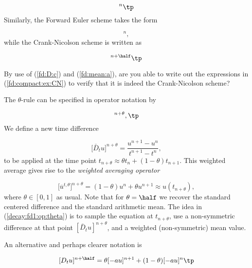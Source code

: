 \documentclass[graybox,sectrefs,envcountresetchap,open=right,final]{svmonodo}
\newenvironment{question_mdfboxadmon}[1][]{
\begin{question_mdfboxmdframed}[frametitle=#1]
}
{
\end{question_mdfboxmdframed}
}
\begin{document}
\begin{equation}
[D_t^- u  = -au]^n \tp
\end{equation}
Similarly, the Forward Euler scheme takes the form

\begin{equation}
[D_t^+ u  = -au]^n,
\end{equation}
while the Crank-Nicolson scheme is written as

\begin{equation}
[D_t u = -a\overline{u}^t]^{n+\half}\tp
\label{fd:compact:ex:CN}
\end{equation}


\begin{question_mdfboxadmon}[Question:]
By use of (\ref{fd:D:c}) and (\ref{fd:mean:a}), are you able to
write out the expressions in (\ref{fd:compact:ex:CN}) to verify that
it is indeed the Crank-Nicolson scheme?
\end{question_mdfboxadmon}




The $\theta$-rule can be specified in operator notation by

\begin{equation}
[\bar D_t u = -a\overline{u}^{t,\theta}]^{n+\theta},\tp
\label{decay:fd1:op:theta}
\end{equation}
We define a new time difference

\begin{equation}
\lbrack\bar D_t u\rbrack^{n+\theta} = \frac{u^{n+1}-u^n}{t^{n+1}-t^n},
\label{decay:fd1:Du:theta}
\end{equation}
to be applied at the time point $t_{n+\theta}\approx\theta t_n + (1-\theta)t_{n+1}$. This weighted average gives rise to the
\emph{weighted averaging operator}

\begin{equation}
\lbrack\overline{u}^{t,\theta}\rbrack^{n+\theta} = (1-\theta)u^{n} + \theta u^{n+1}
\approx u(t_{n+\theta}),
\label{decay:fd1:wmean:a}
\end{equation}
where $\theta\in [0,1]$ as usual. Note that for $\theta =\half$ we recover
the standard centered difference and the standard arithmetic mean.
The idea in (\ref{decay:fd1:op:theta}) is to sample the equation at
$t_{n+\theta}$, use a non-symmetric difference at that
point $[\bar D_t u]^{n+\theta}$, and a weighted (non-symmetric) mean value.

An alternative and perhaps clearer notation is

\[ [D_t u]^{n+\half} = \theta [-au]^{n+1} + (1-\theta)[-au]^{n}\tp \]
\end{document}
